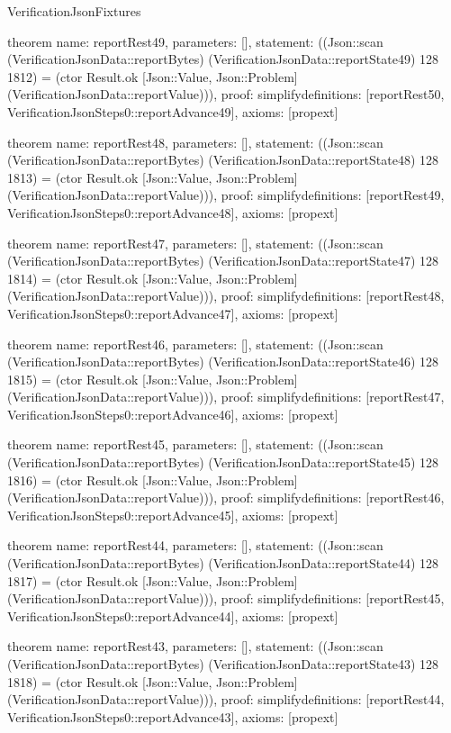 \begin{lexlean}{VerificationJsonFixtures}
\begin{semanticmodule}
theorem{
  name: reportRest49,
  parameters: [],
  statement: ((Json::scan (VerificationJsonData::reportBytes) (VerificationJsonData::reportState49) 128 1812) = (ctor Result.ok [Json::Value, Json::Problem] (VerificationJsonData::reportValue))),
  proof: simplify{definitions: [reportRest50, VerificationJsonSteps0::reportAdvance49]},
  axioms: [propext]
}

theorem{
  name: reportRest48,
  parameters: [],
  statement: ((Json::scan (VerificationJsonData::reportBytes) (VerificationJsonData::reportState48) 128 1813) = (ctor Result.ok [Json::Value, Json::Problem] (VerificationJsonData::reportValue))),
  proof: simplify{definitions: [reportRest49, VerificationJsonSteps0::reportAdvance48]},
  axioms: [propext]
}

theorem{
  name: reportRest47,
  parameters: [],
  statement: ((Json::scan (VerificationJsonData::reportBytes) (VerificationJsonData::reportState47) 128 1814) = (ctor Result.ok [Json::Value, Json::Problem] (VerificationJsonData::reportValue))),
  proof: simplify{definitions: [reportRest48, VerificationJsonSteps0::reportAdvance47]},
  axioms: [propext]
}

theorem{
  name: reportRest46,
  parameters: [],
  statement: ((Json::scan (VerificationJsonData::reportBytes) (VerificationJsonData::reportState46) 128 1815) = (ctor Result.ok [Json::Value, Json::Problem] (VerificationJsonData::reportValue))),
  proof: simplify{definitions: [reportRest47, VerificationJsonSteps0::reportAdvance46]},
  axioms: [propext]
}

theorem{
  name: reportRest45,
  parameters: [],
  statement: ((Json::scan (VerificationJsonData::reportBytes) (VerificationJsonData::reportState45) 128 1816) = (ctor Result.ok [Json::Value, Json::Problem] (VerificationJsonData::reportValue))),
  proof: simplify{definitions: [reportRest46, VerificationJsonSteps0::reportAdvance45]},
  axioms: [propext]
}

theorem{
  name: reportRest44,
  parameters: [],
  statement: ((Json::scan (VerificationJsonData::reportBytes) (VerificationJsonData::reportState44) 128 1817) = (ctor Result.ok [Json::Value, Json::Problem] (VerificationJsonData::reportValue))),
  proof: simplify{definitions: [reportRest45, VerificationJsonSteps0::reportAdvance44]},
  axioms: [propext]
}

theorem{
  name: reportRest43,
  parameters: [],
  statement: ((Json::scan (VerificationJsonData::reportBytes) (VerificationJsonData::reportState43) 128 1818) = (ctor Result.ok [Json::Value, Json::Problem] (VerificationJsonData::reportValue))),
  proof: simplify{definitions: [reportRest44, VerificationJsonSteps0::reportAdvance43]},
  axioms: [propext]
}


\end{semanticmodule}
\end{lexlean}
